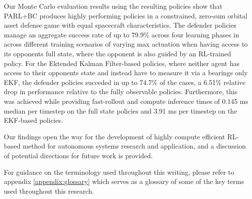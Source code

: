 Our Monte Carlo evaluation results using the resulting policies show that PARL+BC produces highly performing policies in a constrained, zero-sum orbital asset defense game with equal spacecraft characteristics. The defender policies manage an aggregate success rate of up to 79.9\% across four learning phases in across different training scenarios of varying max actuation when having access to its opponents full state, where the opponent is also guided by an RL-trained policy. For the Ektended Kalman Filter-based policies, where neither agent has access to their opponents state and instead have to measure it via a bearings only EKF, the defender policies succeded in up to 74.7\% of the cases, a 6.51\% relative drop in performance relative to the fully observable policies. Furthermore, this was achieved while providing fast-rollout and compute inference times of 0.145 ms median per timestep on the full state policies and 3.91 ms per timestep on the EKF-based policies.

Our findings open the way for the development of highly compute efficient RL-based method for autonomous systems research and application, and a discussion of potential directions for future work is provided.

For guidance on the terminology used throughout this writing, please refer to appendix \ref{appendix:glossary} which serves as a glossary of some of the key terms used throughout this research.